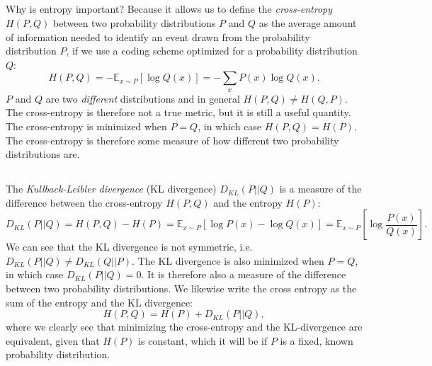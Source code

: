     \subsection{}
        Why is entropy important? Because it allows us to define the \textit{cross-entropy} $H(P, Q)$ between two probability distributions $P$ and $Q$ as the average amount of information needed to identify an event drawn from the probability distribution $P$, if we use a coding scheme optimized for a probability distribution $Q$:
        \begin{equation}
            H(P,Q) = -\mathbb{E}_{x \sim P}[\log Q(x)] = -\sum_{x} P(x) \log Q(x).
        \end{equation}
        $P$ and $Q$ are two \textit{different} distributions and in general $H(P,Q) \neq H(Q,P)$. The cross-entropy is therefore not a true metric, but it is still a useful quantity. The cross-entropy is minimized when $P=Q$, in which case $H(P,Q) = H(P)$. The cross-entropy is therefore some measure of how different two probability distributions are.
    
    \subsection{}
        The \textit{Kullback-Leibler divergence} (KL divergence) $D_{KL}(P||Q)$ is a measure of the difference between the cross-entropy $H(P,Q)$ and the entropy $H(P)$:
        \begin{equation}\label{eq:ML:binary_classifier:information_theory:KL_divergence}
            D_{KL}(P||Q) = H(P,Q) - H(P) = \mathbb{E}_{x \sim P}[\log P(x) - \log Q(x)] = \mathbb{E}_{x \sim P}\left[\log \frac{P(x)}{Q(x)}\right].
        \end{equation}
        We can see that the KL divergence is not symmetric, i.e. $D_{KL}(P||Q) \neq D_{KL}(Q||P)$. The KL divergence is also minimized when $P=Q$, in which case $D_{KL}(P||Q) = 0$. It is therefore also a measure of the difference between two probability distributions. We likewise write the cross entropy as the sum of the entropy and the KL divergence:
        \begin{equation}\label{eq:ML:binary_classifier:information_theory:cross_entropy_as_sum_of_entropy_and_KL_divergence}
            H(P,Q) = H(P) + D_{KL}(P||Q),
        \end{equation}
        where we clearly see that minimizing the cross-entropy and the KL-divergence are equivalent, given that $H(P)$ is constant, which it will be if $P$ is a fixed, known probability distribution.


